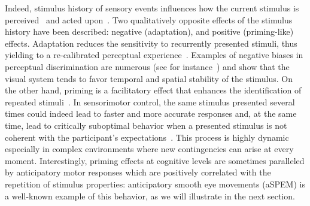 \documentclass[12pt,english]{article}%
\newcommand{\citep}[1]{\parencite{#1}}
\newcommand{\citet}[1]{\textcite{#1}}
\newcommand{\AM}[1]{\textbf{\textcolor{blue}{[AM: #1]}}}
\begin{document}
Indeed, stimulus history of sensory events influences
how the current stimulus is perceived~\citep{Sotiropoulos2011,Adams12,ChopinMamassian2012,FischerWhitney2014,Cicchini_PRSB_2018} and
acted upon~\citep{WallmanFuchs1998,Carpenter1995, Maus2015,Damasse18}.
Two qualitatively opposite effects of the stimulus history have been described: 
negative (adaptation), and positive (priming-like) effects.
Adaptation reduces the sensitivity to recurrently presented stimuli,
thus yielding to a re-calibrated perceptual experience~\citep{Clifford2007, Webster2011, Kohn2007}. Examples of negative biases in perceptual discrimination are numerous (see for instance~\citet{KanaiVerstraten2005,ChopinMamassian2012}) and show that the visual system tends
to favor temporal and spatial stability of the stimulus.
On the other hand, priming is a facilitatory effect that
enhances the identification of repeated stimuli~\citep{Verstraten1994, Tiest2009}.
In sensorimotor control,
the same stimulus presented several times could indeed
lead to faster and more accurate responses and,
at the same time, lead to critically suboptimal behavior
when a presented stimulus is not coherent
with the participant's expectations~\citep{Hyman1953, Yu2009}. This process is highly dynamic especially in complex environments
where new contingencies can arise at every moment.
Interestingly, priming effects at cognitive levels
are sometimes paralleled by anticipatory motor responses which are positively correlated with the repetition of stimulus properties: anticipatory smooth eye movements (aSPEM) is a well-known example of this behavior, as we will illustrate in the next section.
\end{document}
